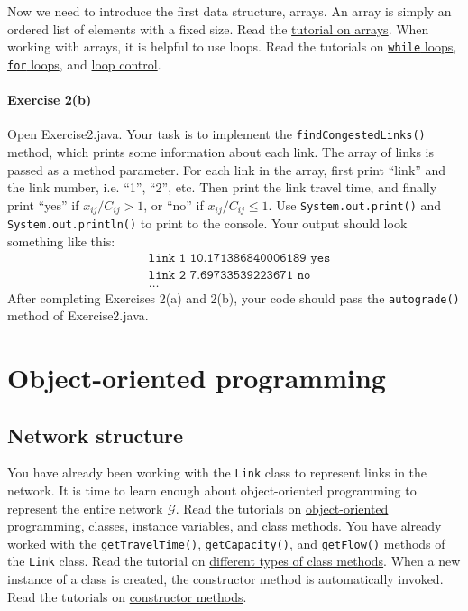 \documentclass[12pt]{article}
\begin{document}
Now we need to introduce the first data structure, arrays. An array is simply an ordered list of elements with a fixed size. Read the \href{https://www.w3schools.com/java/java_arrays.asp}{tutorial on arrays}. When working with arrays, it is helpful to use loops. Read the tutorials on \href{https://www.w3schools.com/java/java_while_loop.asp}{\texttt{while} loops}, \href{https://docs.oracle.com/javase/tutorial/java/nutsandbolts/while.html}{\texttt{for} loops}, and \href{https://www.w3schools.com/java/java_break.asp}{loop control}.

\paragraph*{Exercise 2(b)} Open Exercise2.java. Your task is to implement the \texttt{findCongestedLinks()} method, which prints some information about each link.  The array of links is passed as a method parameter. For each link in the array, first print ``link'' and the link number, i.e. ``1'', ``2'', etc. Then print the link travel time, and finally print ``yes'' if $x_{ij}/C_{ij} >1$, or ``no'' if $x_{ij}/C_{ij} \leq 1$. Use \texttt{System.out.print()} and \texttt{System.out.println()} to print to the console.
	Your output should look something like this:
	\begin{align*}
		& \texttt{link 1 10.171386840006189 yes} \\
		&\texttt{link 2 7.69733539223671 no} \\
		& \ldots
	\end{align*}
After completing Exercises 2(a) and 2(b), your code should pass the \texttt{autograde()} method of Exercise2.java. 
	
	
	
	
\section{Object-oriented programming}

\subsection{Network structure}

\label{sec31}
	
You have already been working with the \texttt{Link} class to represent links in the network. It is time to learn enough about object-oriented programming to represent the entire network $\mathcal{G}$. Read the tutorials on \href{https://www.w3schools.com/java/java_oop.asp}{object-oriented programming},  \href{https://www.w3schools.com/java/java_classes.asp}{classes}, \href{https://www.w3schools.com/java/java_class_attributes.asp}{instance variables}, and \href{https://www.w3schools.com/java/java_class_methods.asp}{class methods}. You have already worked with the \texttt{getTravelTime()}, \texttt{getCapacity()}, and \texttt{getFlow()} methods of the \texttt{Link} class. Read the tutorial on \href{https://www.w3schools.com/java/java_modifiers.asp}{different types of class methods}.
When a new instance of a class is created, the constructor method is automatically invoked. Read the tutorials on \href{https://www.w3schools.com/java/java_constructors.asp}{constructor methods}.
 
\end{document}
